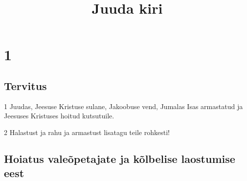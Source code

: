 

\title{Juuda kiri}

\chapter{1}

\section*{Tervitus}

\par 1 Juudas, Jeesuse Kristuse sulane, Jakoobuse vend, Jumalas Isas armastatud ja Jeesuses Kristuses hoitud kutsutuile.
\par 2 Halastust ja rahu ja armastust lisatagu teile rohkesti!

\section*{Hoiatus valeõpetajate ja kõlbelise laostumise eest}

